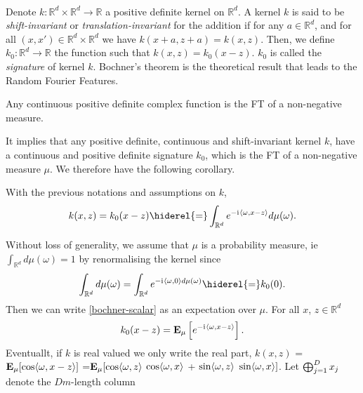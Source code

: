 \paragraph{}
Denote $k: \mathbb{R}^d \times \mathbb{R}^d \to \mathbb{R}$ a positive
definite kernel on $\mathbb{R}^d$. A kernel $k$ is said to be
\emph{shift-invariant} or \emph{translation-invariant} for the addition if for
any $a \in \mathbb{R}^d$, and for all $(x,x') \in \mathbb{R}^d \times
\mathbb{R}^d$ we have $k(x+a,z+a) = k(x,z)$.  Then, we define $k_0: \mathbb{R}^d
\to \mathbb{R}$ the function such that $k(x,z)= k_0(x-z)$. $k_0$ is
called the \emph{signature} of kernel $k$. Bochner's theorem
\cite{folland1994course} is the theoretical result that leads to the Random
Fourier Features.
\begin{theorem}\label{th:bochner-scalar}
    Any continuous positive definite complex function is the \acl{FT} of a
    non-negative measure.
\end{theorem}
It implies that any positive definite, continuous and shift-invariant kernel
$k$, have a continuous and positive definite signature $k_0$, which is the
\acl{FT} of a non-negative measure $\mu$. We therefore have the following
corollary.
\begin{corollary}\label{c:bochner-app}
    With the previous notations and assumptions on $k$,
    \begin{dmath}\label{bochner-scalar}
        k(x,z)=k_0(x-z) \hiderel{=} \int_{\mathbb{R}^d} e^{-\iu \inner{\omega,x
        - z}} d\mu(\omega).
    \end{dmath}
\end{corollary}
Without loss of generality, we assume that $\mu$ is a probability measure,
\acs{ie} $\int_{\mathbb{R}^d} d\mu(\omega)=1$ by renormalising the kernel since
\begin{dmath*}
    \int_{\mathbb{R}^d}d\mu(\omega)= \int_{\mathbb{R}^d}e^{-\iu \inner{\omega,
    0}d\mu(\omega)}\hiderel{=}k_0(0). 
\end{dmath*}
Then we can write \cref{bochner-scalar} as an
expectation over $\mu$. For all $x$,
$z\in\mathbb{R}^d$
\begin{dmath*}
    k_0(x-z) = \expectation_{\mu}\left[e^{-\iu \inner{\omega,x - z}}\right].
\end{dmath*}
Eventuallt, if $k$ is real valued we only write the real part, $k(x,z)$ =
${\mathbf{{E}}}_{\mu}[\cos \langle\omega,x - z\rangle]$ =${\mathbf{{E}}}_{\mu}[ \cos
\langle\omega,z\rangle$ $\cos \langle\omega,x\rangle$ + $\sin \langle\omega,z\rangle$ $\sin
\langle\omega,x\rangle]$.  Let $\operatorname*{\bigoplus}_{j=1}^D x_j$ denote the $Dm$-length column
